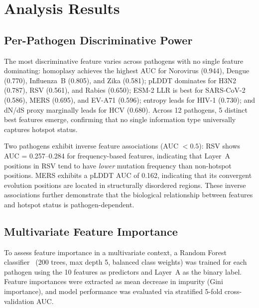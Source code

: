 \section{Analysis Results}
\label{sec:adapt_analysis}

\subsection{Per-Pathogen Discriminative Power}
\label{subsec:per_pathogen_disc}

The most discriminative feature varies across pathogens with no single feature dominating: homoplasy achieves the highest AUC for Norovirus (0.944), Dengue (0.770), Influenza~B (0.805), and Zika (0.581); pLDDT dominates for H3N2 (0.787), RSV (0.561), and Rabies (0.650); ESM-2 LLR is best for SARS-CoV-2 (0.586), MERS (0.695), and EV-A71 (0.596); entropy leads for HIV-1 (0.730); and dN/dS proxy marginally leads for HCV (0.680).
Across 12 pathogens, 5 distinct best features emerge, confirming that no single information type universally captures hotspot status.

Two pathogens exhibit inverse feature associations (AUC $< 0.5$): RSV shows AUC = 0.257--0.284 for frequency-based features, indicating that Layer~A positions in RSV tend to have \textit{lower} mutation frequency than non-hotspot positions.
MERS exhibits a pLDDT AUC of 0.162, indicating that its convergent evolution positions are located in structurally disordered regions.
These inverse associations further demonstrate that the biological relationship between features and hotspot status is pathogen-dependent.

\subsection{Multivariate Feature Importance}
\label{subsec:rf_importance_adapt}

To assess feature importance in a multivariate context, a Random Forest classifier~\cite{breiman2001random} (200 trees, max depth 5, balanced class weights) was trained for each pathogen using the 10 features as predictors and Layer~A as the binary label.
Feature importances were extracted as mean decrease in impurity (Gini importance), and model performance was evaluated via stratified 5-fold cross-validation AUC.

